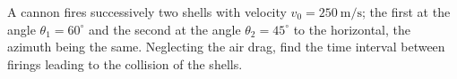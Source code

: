 
\item A cannon fires successively two shells with velocity \( v_0 = 250 \ \text{m/s} \); the first at the angle \( \theta_1 = 60^\circ \) and the second at the angle \( \theta_2 = 45^\circ \) to the horizontal, the azimuth being the same. Neglecting the air drag, find the time interval between firings leading to the collision of the shells.
